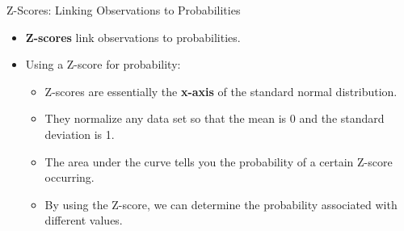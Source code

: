 \documentclass[
  ignorenonframetext,
]{beamer}
\providecommand{\tightlist}{%
  \setlength{\itemsep}{0pt}\setlength{\parskip}{0pt}}
\begin{document}
\begin{frame}{Z-Scores: Linking Observations to Probabilities}
\label{z-scores-linking-observations-to-probabilities}
\begin{itemize}
\tightlist
\item
  \textbf{Z-scores} link observations to probabilities.
\item
  Using a Z-score for probability:

  \begin{itemize}
  \tightlist
  \item
    Z-scores are essentially the \textbf{x-axis} of the standard normal
    distribution.
  \item
    They normalize any data set so that the mean is 0 and the standard
    deviation is 1.
  \item
    The area under the curve tells you the probability of a certain
    Z-score occurring.
  \item
    By using the Z-score, we can determine the probability associated
    with different values.
  \end{itemize}
\end{itemize}
\end{frame}
\end{document}
